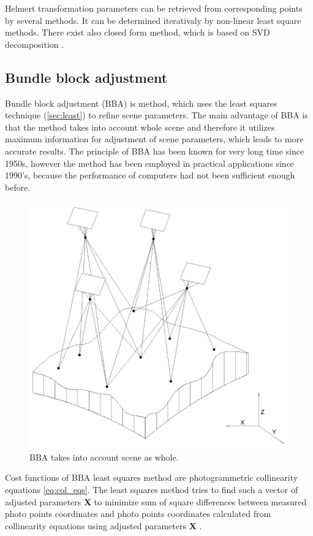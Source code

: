 \documentclass[a4paper,12pt]{article}
\newcommand{\evect}[1]{
{\bf #1}
}
\begin{document}
Helmert transformation parameters can be retrieved from corresponding points by several methods. It can be determined
iterativaly by non-linear least square methods. There exist also closed form method, which is based on SVD decomposition
\cite{sjoberg2013closed}.


\subsection{Bundle block adjustment}

Bundle block adjustment (BBA) is method, which uses the least squares technique (\ref{sec:least}) to refine scene parameters. 
The main advantage of BBA is that the method takes into account whole scene and therefore it utilizes 
maximum information for adjustment of scene parameters, which leads to more accurate results.
The principle of BBA has been known for very long time since 1950s,
however the method has been employed in practical applications since 1990's, because the performance of computers had not been 
sufficient enough before. 


\begin{figure}[h]
    \centering
    \includegraphics[scale=0.3]{figures/bba.png}
    \caption{BBA takes into account scene as whole.}
    \label{fig:rel_or_amb}
\end{figure}

Cost functions of BBA least squares method are photogrammetric collinearity equations \eqref{eq:col_eqs}.
The least squares method tries to find such a vector of adjusted parameters \evect{X} to minimize
sum  of square differences between measured photo points coordinates and photo points coordinates calculated 
from collinearity equations using adjusted parameters \evect{X}.
\end{document}
